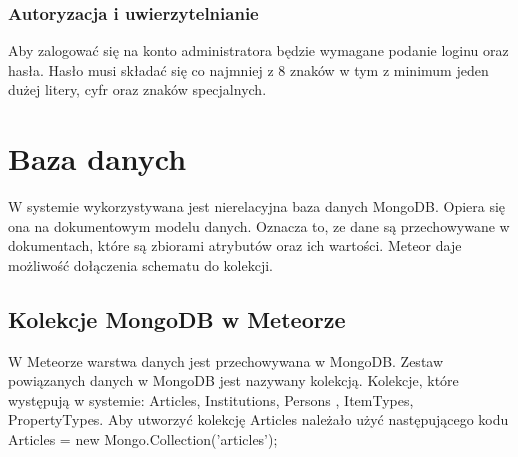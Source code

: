 \documentclass{article}
\begin{document}
\subsubsection{Autoryzacja i uwierzytelnianie}

	Aby zalogować się na konto administratora będzie wymagane podanie loginu oraz hasła. Hasło musi składać się co najmniej z 8 znaków w tym z minimum jeden dużej litery, cyfr oraz znaków specjalnych.
\section {Baza danych}
	W systemie wykorzystywana jest nierelacyjna baza danych MongoDB. Opiera się ona na dokumentowym modelu danych. Oznacza to, ze dane są przechowywane w dokumentach, które są zbiorami atrybutów oraz ich wartości. Meteor daje możliwość dołączenia schematu do kolekcji.
\subsection{Kolekcje MongoDB w Meteorze}
	W Meteorze warstwa danych jest przechowywana w MongoDB. Zestaw powiązanych danych w MongoDB jest nazywany kolekcją. Kolekcje, które występują w systemie:
	Articles, Institutions, Persons , ItemTypes, PropertyTypes. Aby utworzyć kolekcję Articles należało użyć następującego kodu Articles = new Mongo.Collection('articles');
\end{document}
